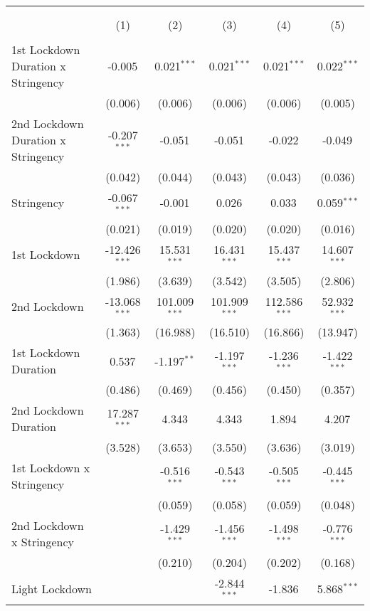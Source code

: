 \begin{tabular}{@{\extracolsep{5pt}}lccccc}
\\[-1.8ex]\hline
\hline \\[-1.8ex]
& \multicolumn{5}{c}{\textit{}} \
\cr \cline{5-6}
\\[-1.8ex] & (1) & (2) & (3) & (4) & (5) \\
\hline \\[-1.8ex]
 1st Lockdown Duration x Stringency & -0.005$^{}$ & 0.021$^{***}$ & 0.021$^{***}$ & 0.021$^{***}$ & 0.022$^{***}$ \\
  & (0.006) & (0.006) & (0.006) & (0.006) & (0.005) \\
 2nd Lockdown Duration x Stringency & -0.207$^{***}$ & -0.051$^{}$ & -0.051$^{}$ & -0.022$^{}$ & -0.049$^{}$ \\
  & (0.042) & (0.044) & (0.043) & (0.043) & (0.036) \\
 Stringency & -0.067$^{***}$ & -0.001$^{}$ & 0.026$^{}$ & 0.033$^{}$ & 0.059$^{***}$ \\
  & (0.021) & (0.019) & (0.020) & (0.020) & (0.016) \\
 1st Lockdown & -12.426$^{***}$ & 15.531$^{***}$ & 16.431$^{***}$ & 15.437$^{***}$ & 14.607$^{***}$ \\
  & (1.986) & (3.639) & (3.542) & (3.505) & (2.806) \\
 2nd Lockdown & -13.068$^{***}$ & 101.009$^{***}$ & 101.909$^{***}$ & 112.586$^{***}$ & 52.932$^{***}$ \\
  & (1.363) & (16.988) & (16.510) & (16.866) & (13.947) \\
 1st Lockdown Duration & 0.537$^{}$ & -1.197$^{**}$ & -1.197$^{***}$ & -1.236$^{***}$ & -1.422$^{***}$ \\
  & (0.486) & (0.469) & (0.456) & (0.450) & (0.357) \\
 2nd Lockdown Duration & 17.287$^{***}$ & 4.343$^{}$ & 4.343$^{}$ & 1.894$^{}$ & 4.207$^{}$ \\
  & (3.528) & (3.653) & (3.550) & (3.636) & (3.019) \\
 1st Lockdown x Stringency & & -0.516$^{***}$ & -0.543$^{***}$ & -0.505$^{***}$ & -0.445$^{***}$ \\
  & & (0.059) & (0.058) & (0.059) & (0.048) \\
 2nd Lockdown x Stringency & & -1.429$^{***}$ & -1.456$^{***}$ & -1.498$^{***}$ & -0.776$^{***}$ \\
  & & (0.210) & (0.204) & (0.202) & (0.168) \\
 Light Lockdown & & & -2.844$^{***}$ & -1.836$^{}$ & 5.868$^{***}$ \\

\end{tabular}
